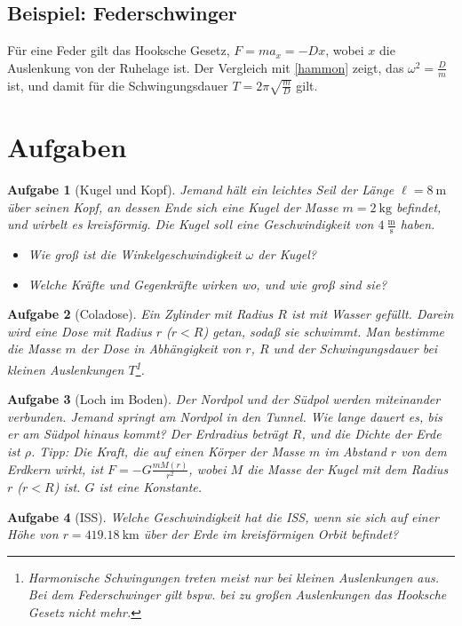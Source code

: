 \documentclass[a4paper,8pt]{extarticle}
\theoremstyle{problemstyle}
\newtheorem{problem}{Aufgabe}
\begin{document}
\begin{multicols}{2}
\subsection*{Beispiel: Federschwinger}
Für eine Feder gilt das Hooksche Gesetz, $F= ma_x = - D x$, wobei $x$ die Auslenkung von der Ruhelage ist. Der Vergleich mit \eqref{hammon} zeigt, das $\omega^2 = \frac{D}{m}$ ist, und damit für die Schwingungsdauer $T = 2\pi \sqrt{\frac{m}{D}}$ gilt.
\section*{Aufgaben}
\begin{problem}[Kugel und Kopf]
Jemand hält ein leichtes Seil der Länge $\ell = 8~\mathrm{m}$ über seinen Kopf, an dessen Ende sich eine Kugel der Masse $m = 2~\mathrm{kg}$ befindet, und wirbelt es kreisförmig. Die Kugel soll eine Geschwindigkeit von $4~\mathrm{\frac{m}{s}}$ haben.
\begin{multicols}{2}
\begin{itemize}
    \item[a)] Wie groß ist die Winkelgeschwindigkeit $\omega$ der Kugel?
    \item[b)] Welche Kräfte und Gegenkräfte wirken wo, und wie groß sind sie?
\end{itemize}
\end{multicols}
\end{problem}
\begin{problem}[Coladose]
Ein Zylinder mit Radius $R$ ist mit Wasser gefüllt. Darein wird eine Dose mit Radius $r$ ($r<R$) getan, sodaß sie schwimmt. Man bestimme die Masse $m$ der Dose in Abhängigkeit von $r$, $R$ und der Schwingungsdauer bei kleinen Auslenkungen $T$\footnote{Harmonische Schwingungen treten meist nur bei \textit{kleinen} Auslenkungen aus. Bei dem Federschwinger gilt bspw. bei zu großen Auslenkungen das Hooksche Gesetz nicht mehr.}.
\end{problem}
\begin{problem}[Loch im Boden]
Der Nordpol und der Südpol werden  miteinander verbunden. Jemand springt am Nordpol in den Tunnel. Wie lange dauert es, bis er am Südpol hinaus kommt? Der Erdradius beträgt $R$, und die Dichte der Erde ist $\rho$. \textit{Tipp: Die Kraft, die auf einen Körper der Masse $m$ im Abstand $r$ von dem Erdkern wirkt, ist $F = -G\frac{mM\left(r\right)}{r^2}$, wobei $M$ die Masse der Kugel mit dem Radius $r$ ($r<R$) ist. $G$ ist eine Konstante.}
\end{problem}
\begin{problem}[ISS]
Welche Geschwindigkeit hat die ISS, wenn sie sich auf einer Höhe von $r =  419.18~\mathrm{km}$ über der Erde im kreisförmigen Orbit befindet?
\end{problem}
\end{multicols}
\end{document}
